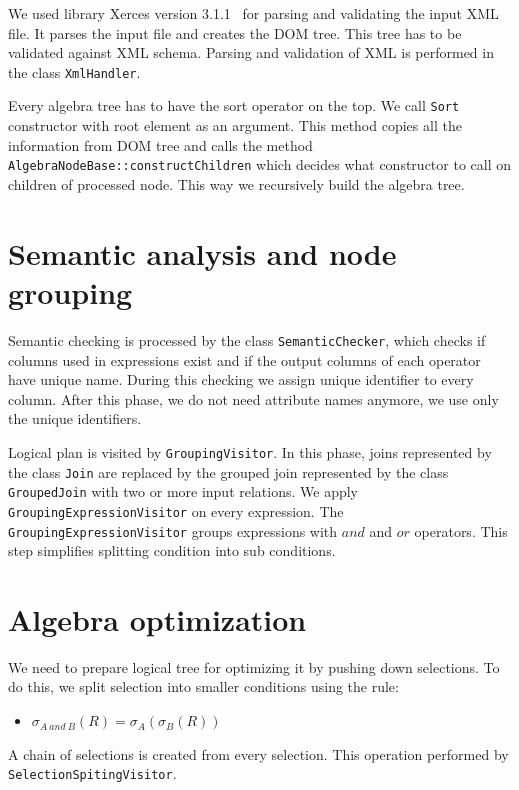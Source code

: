 We used library Xerces version 3.1.1~\cite{xerces} for parsing and validating the input XML file. It parses the input file and creates the DOM tree. This tree has to be validated against XML schema. Parsing and validation of XML is performed in the class \texttt{XmlHandler}.

Every algebra tree has to have the sort operator on the top. We call \texttt{Sort} constructor with root element as an argument. This method copies all the information from DOM tree and calls the method \texttt{AlgebraNodeBase::constructChildren} which decides what constructor to call on children of processed node. This way we recursively build the algebra tree.



\section{Semantic analysis and node grouping}

Semantic checking is processed by the class \texttt{SemanticChecker}, which checks if columns used in expressions exist and if the output columns of each operator have unique name. During this checking we assign unique identifier to every column. After this phase, we do not need attribute names anymore, we use only the unique identifiers.

Logical plan is visited by \texttt{GroupingVisitor}. In this phase, joins represented by the class \texttt{Join} are replaced by the grouped join represented by the class \texttt{GroupedJoin} with two or more input relations. We apply \texttt{GroupingExpressionVisitor} on every expression. The \texttt{GroupingExpressionVisitor} groups expressions with $and$ and $or$ operators. This step simplifies splitting condition into sub conditions.

\section{Algebra optimization}

We need to prepare logical tree for optimizing it by pushing down selections. To do this, we split selection into smaller conditions using the rule:
\begin{itemize}
\item $\sigma_{A~and~B}(R)=\sigma_{A}(\sigma_{B}(R))$
\end{itemize}
A chain of selections is created from every selection. This operation performed by \texttt{SelectionSpitingVisitor}.

